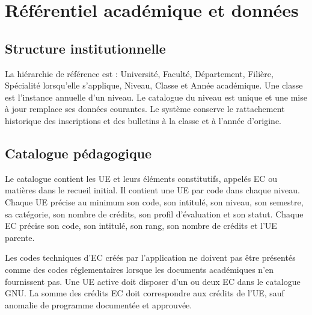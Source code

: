\documentclass[11pt,a4paper]{article}
\begin{document}
\section{Référentiel académique et données}

\subsection{Structure institutionnelle}
La hiérarchie de référence est : Université, Faculté, Département, Filière, Spécialité lorsqu'elle s'applique, Niveau, Classe et Année académique. Une classe est l'instance annuelle d'un niveau. Le catalogue du niveau est unique et une mise à jour remplace ses données courantes. Le système conserve le rattachement historique des inscriptions et des bulletins à la classe et à l'année d'origine.

\subsection{Catalogue pédagogique}
Le catalogue contient les UE et leurs éléments constitutifs, appelés EC ou matières dans le recueil initial. Il contient une UE par code dans chaque niveau. Chaque UE précise au minimum son code, son intitulé, son niveau, son semestre, sa catégorie, son nombre de crédits, son profil d'évaluation et son statut. Chaque EC précise son code, son intitulé, son rang, son nombre de crédits et l'UE parente.

Les codes techniques d'EC créés par l'application ne doivent pas être présentés comme des codes réglementaires lorsque les documents académiques n'en fournissent pas. Une UE active doit disposer d'un ou deux EC dans le catalogue GNU. La somme des crédits EC doit correspondre aux crédits de l'UE, sauf anomalie de programme documentée et approuvée.
\end{document}
